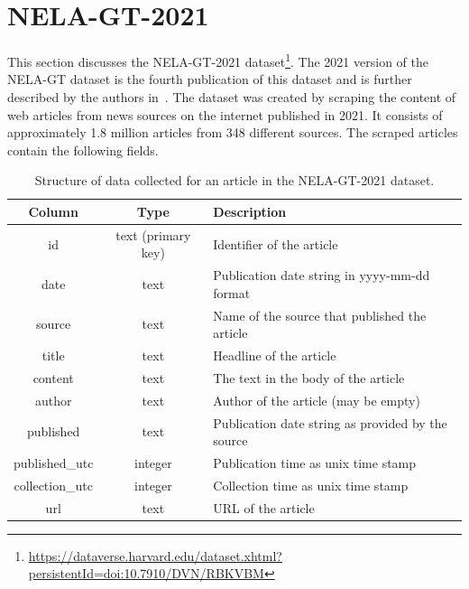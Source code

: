 \section{NELA-GT-2021}
\label{nela}
This section discusses the NELA-GT-2021 dataset\footnote{\url{https://dataverse.harvard.edu/dataset.xhtml?persistentId=doi:10.7910/DVN/RBKVBM}}. The 2021 version of the NELA-GT dataset is the fourth publication of this dataset and is further described by the authors in~\cite{nela-paper}. 
The dataset was created by scraping the content of web articles from news sources on the internet published in 2021. It consists of approximately 1.8 million articles from 348 different sources. The scraped articles contain the following fields.

\begin{table}[H]
    \centering
\begin{tabular}{c|c|l}
\rowcolor[HTML]{FFFFFF} 
\textbf{Column} & \textbf{Type}               & \textbf{Description}                              \\ \hline
id              & text (primary key)          & Identifier of the article                         \\
date            & text                        & Publication date string in yyyy-mm-dd format      \\
source          & text                        & Name of the source that published the article     \\
title           & text                        & Headline of the article                           \\
content         & text                        & The text in the body of the article               \\
author          & text                        & Author of the article (may be empty)              \\
published       & text                        & Publication date string as provided by the source \\
published\_utc  & integer                     & Publication time as unix time stamp               \\
collection\_utc & integer                     & Collection time as unix time stamp                \\
url             & text                        & URL of the article                               
\end{tabular}
    \caption{Structure of data collected for an article in the NELA-GT-2021 dataset.}
    \label{tab:nela_fields}
\end{table}

